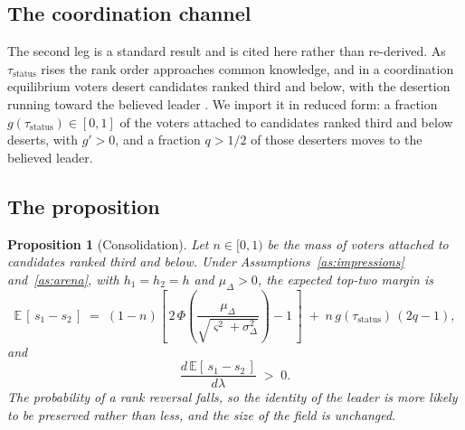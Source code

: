 \documentclass[11pt]{article}
\newtheorem{proposition}{Proposition}
\theoremstyle{definition}
\theoremstyle{remark}
\begin{document}
\subsection{The coordination channel}

The second leg is a standard result and is cited here rather than re-derived.
As $\tau_{\mathrm{status}}$ rises the rank order approaches common
knowledge, and in a coordination equilibrium voters desert candidates ranked
third and below, with the desertion running toward the believed leader
\citep{myerson1993,fey1997,cox1997}. We import it in reduced form: a fraction
$g(\tau_{\mathrm{status}}) \in [0,1]$ of the voters attached to candidates
ranked third and below deserts, with $g' > 0$, and a fraction $q > 1/2$ of
those deserters moves to the believed leader.

\subsection{The proposition}

\begin{proposition}[Consolidation]
\label{prop:consolidation}
Let $n \in [0,1)$ be the mass of voters attached to candidates ranked third
and below. Under Assumptions~\ref{as:impressions} and~\ref{as:arena}, with
$h_1 = h_2 = h$ and $\mu_\Delta > 0$, the expected top-two margin is
\[
  \mathbb{E}\,[\,s_1 - s_2\,]
  \;=\; (1-n)\left[\,2\,\Phi\!\left(
      \frac{\mu_\Delta}{\sqrt{\varsigma^2 + \sigma^2_\Delta}}\right) - 1
      \,\right]
   \;+\; n\,g(\tau_{\mathrm{status}})\,(2q-1),
\]
and
\[
  \frac{d\,\mathbb{E}[\,s_1 - s_2\,]}{d\lambda} \;>\; 0 .
\]
The probability of a rank reversal falls, so the identity of the leader is
more likely to be preserved rather than less, and the size of the field is
unchanged.
\end{proposition}
\end{document}

